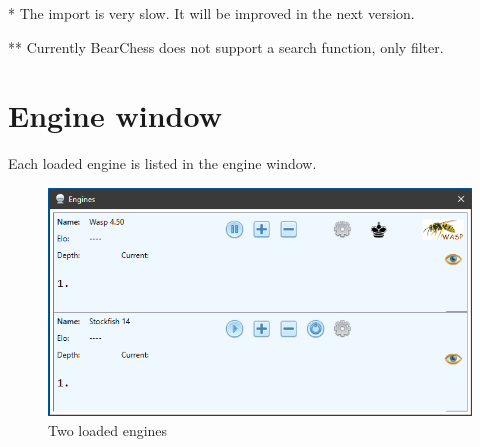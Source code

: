 \documentclass[11pt,a4paper]{article}
\begin{document}
{\color{red}*} The import is very slow. It will be improved in the next version.

{\color{red}**} Currently BearChess does not support a search function, only filter.

\section{Engine window}

Each loaded engine is listed in the engine window.

\begin{figure}[H]
	\centering
	\includegraphics[scale=0.8]{EngineWindow1.png}
	\caption{Two loaded engines}
	\label{fig:EngineWindow1}
\end{figure}
\end{document}
